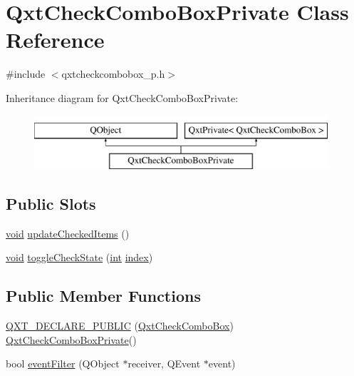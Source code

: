 \hypertarget{class_qxt_check_combo_box_private}{\section{Qxt\-Check\-Combo\-Box\-Private Class Reference}
\label{class_qxt_check_combo_box_private}
}


{\ttfamily \#include $<$qxtcheckcombobox\-\_\-p.\-h$>$}

Inheritance diagram for Qxt\-Check\-Combo\-Box\-Private\-:\begin{figure}[H]
\begin{center}
\leavevmode
\includegraphics[height=2.000000cm]{class_qxt_check_combo_box_private}
\end{center}
\end{figure}
\subsection*{Public Slots}
\begin{DoxyCompactItemize}
\item 
\hyperlink{group___u_a_v_objects_plugin_ga444cf2ff3f0ecbe028adce838d373f5c}{void} \hyperlink{class_qxt_check_combo_box_private_a43d31fc1e9ecdc260aa73efd507d16b1}{update\-Checked\-Items} ()
\item 
\hyperlink{group___u_a_v_objects_plugin_ga444cf2ff3f0ecbe028adce838d373f5c}{void} \hyperlink{class_qxt_check_combo_box_private_a80c3bea8c898b8ef21b35666de32183a}{toggle\-Check\-State} (\hyperlink{ioapi_8h_a787fa3cf048117ba7123753c1e74fcd6}{int} \hyperlink{glext_8h_ab47dd9958bcadea08866b42bf358e95e}{index})
\end{DoxyCompactItemize}
\subsection*{Public Member Functions}
\begin{DoxyCompactItemize}
\item 
\hyperlink{class_qxt_check_combo_box_private_a7ae628e53b78394b9ddfe07bda3009be}{Q\-X\-T\-\_\-\-D\-E\-C\-L\-A\-R\-E\-\_\-\-P\-U\-B\-L\-I\-C} (\hyperlink{class_qxt_check_combo_box}{Qxt\-Check\-Combo\-Box}) \hyperlink{class_qxt_check_combo_box_private}{Qxt\-Check\-Combo\-Box\-Private}()
\item 
bool \hyperlink{class_qxt_check_combo_box_private_a27e4fde95eb1728e752196ce7fc86113}{event\-Filter} (Q\-Object $\ast$receiver, Q\-Event $\ast$event)
\end{DoxyCompactItemize}
